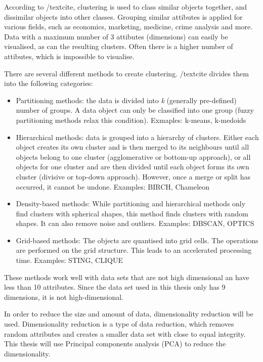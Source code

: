\documentclass[12pt,a4paper]{article}
\begin{document}
According to /textcite, clustering is used to class similar objects together, and dissimilar objects into other classes. Grouping similar attibutes is applied for various fields, such as economics, marketing, medicine, crime analysis and more. Data with a maximum number of 3 attibutes (dimensions) can easily be visualised, as can the resulting clusters. Often there is a higher number of attibutes, which is impossible to visualise.





There are several different methods to create clustering. /textcite divides them into the following categories:
\begin{itemize}
	\item Partitioning methods: the data is divided into \textit{k} (generally pre-defined) number of groups. A data object can only be classified into one group (fuzzy partitioning methods relax this condition). Exmaples: k-means, k-medoids
	\item Hierarchical methods: data is grouped into a hierarchy of clusters. Either each object creates its own cluster and is then merged to its neighbours until all objects belong to one cluster (agglomerative or bottom-up approach), or all objects for one cluster and are then divided until each object forms its own cluster (divisive or top-down approach). However, once a merge or split has occurred, it cannot be undone. Examples: BIRCH, Chameleon
	\item Density-based methods: While partitioning and hierarchical methods only find clusters with spherical shapes, this method finds clusters with random shapes. It can also remove noise and outliers. Examples: DBSCAN, OPTICS
	\item Grid-based methods: The objects are quantised into grid cells. The operations are performed on the grid structure. This leads to an accelerated processing time. Examples: STING, CLIQUE
\end{itemize}
These methods work well with data sets that are not high dimensional an have less than 10 attributes. Since the data set used in this thesis only has 9 dimensions, it is not high-dimensional.

In order to reduce the size and amount of data, dimensionality reduction will be used. Dimensionality reduction is a type of data reduction, which removes random attributes and creates a smaller data set with close to equal integrity. This thesis will use Principal components analysis (PCA) to reduce the dimensionality.
\end{document}
